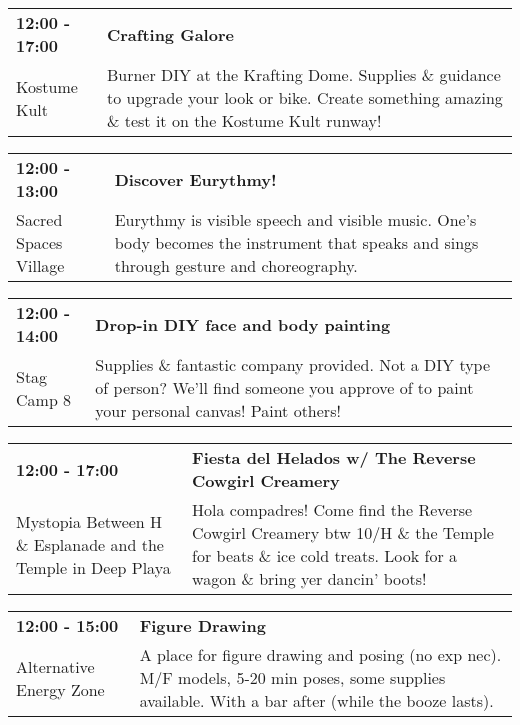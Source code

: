\begin{tabular}{ p{1in} p{2.2in} }
    \textbf{12:00 - 17:00} & \textbf{Crafting Galore} \\
    Kostume Kult \newline  & Burner DIY at the Krafting Dome. Supplies \& guidance to upgrade your look or bike. Create something amazing \& test it on the Kostume Kult runway! \\
    \hline 
\end{tabular}
    
\begin{tabular}{ p{1in} p{2.2in} }
    \textbf{12:00 - 13:00} & \textbf{Discover Eurythmy!} \\
    Sacred Spaces Village \newline  & Eurythmy is visible speech and visible music. One's body becomes the instrument that speaks and sings through gesture and choreography. \\
    \hline 
\end{tabular}
    
\begin{tabular}{ p{1in} p{2.2in} }
    \textbf{12:00 - 14:00} & \textbf{Drop-in DIY face and body painting} \\
    Stag Camp 8 \newline  & Supplies \& fantastic company provided. Not a DIY type of person? We'll find someone you approve of to paint your personal canvas! Paint others! \\
    \hline 
\end{tabular}
    
\begin{tabular}{ p{1in} p{2.2in} }
    \textbf{12:00 - 17:00} & \textbf{Fiesta del Helados w/ The Reverse Cowgirl Creamery} \\
    Mystopia \newline Between H \& Esplanade and the Temple in Deep Playa & Hola compadres! Come find the Reverse Cowgirl Creamery btw 10/H \& the Temple for beats \& ice cold treats. Look for a wagon \& bring yer dancin' boots! \\
    \hline 
\end{tabular}
    
\begin{tabular}{ p{1in} p{2.2in} }
    \textbf{12:00 - 15:00} & \textbf{Figure Drawing} \\
    Alternative Energy Zone \newline  & A place for figure drawing and posing (no exp nec).  M/F models, 5-20 min poses, some supplies available. With a bar after (while the booze lasts). \\
    \hline 
\end{tabular}
    
